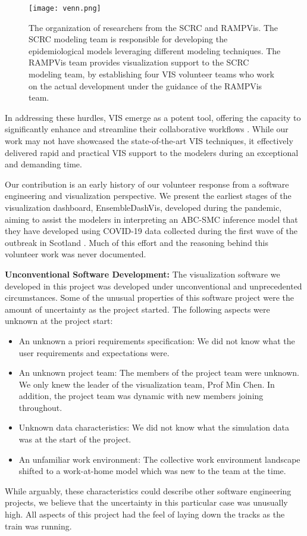 \begin{figure}[tb!]
    \centering
    \texttt{[image: venn.png]}
    \caption{The organization of researchers from the SCRC and RAMPVis. The SCRC modeling team is responsible for developing the epidemiological models leveraging different modeling techniques. The RAMPVis team provides visualization support to the SCRC modeling team, by establishing four VIS volunteer teams who work on the actual development under the guidance of the RAMPVis team.
    }
    \label{fig:venn}

\end{figure}

In addressing these hurdles, \ac{VIS} emerge as a potent tool, offering the capacity to significantly enhance and streamline their collaborative workflows \cite{swallow2022Challenges}.
While our work may not have showcased the state-of-the-art VIS techniques, it effectively delivered rapid and practical VIS support to the modelers during an exceptional and demanding time.

Our contribution is an early history of our volunteer response from a software engineering and visualization perspective.
We present the earliest stages of the visualization dashboard, EnsembleDashVis, developed during the pandemic, aiming to assist the modelers in interpreting an \ac{ABC-SMC} inference model that they have developed using COVID-19 data collected during the first wave of the outbreak in Scotland \cite{2020Covid19}. 
Much of this effort and the reasoning behind this volunteer work was never documented.

\noindent
\textbf{Unconventional Software Development:}  
The visualization software we developed in this project was developed under unconventional and unprecedented circumstances.
Some of the unusual properties of this software project were the amount of uncertainty as the project started.
The following aspects were unknown at the project start:
\begin{itemize}[itemsep=0pt,topsep=0pt]
    \item An unknown a priori requirements specification: We did not know what the user requirements and expectations were.
    \item An unknown project team: The members of the project team were unknown.
    We only knew the leader of the visualization team, Prof Min Chen. 
    In addition, the project team was dynamic with new members joining throughout.
    \item Unknown data characteristics: We did not know what the simulation data was at the start of the project.
    \item An unfamiliar work environment: The collective work environment landscape shifted to a work-at-home model which was new to the team at the time.
\end{itemize}
While arguably, these characteristics could describe other software engineering projects, we believe that the uncertainty in this particular case was unusually high.
All aspects of this project had the feel of laying down the tracks as the train was running.